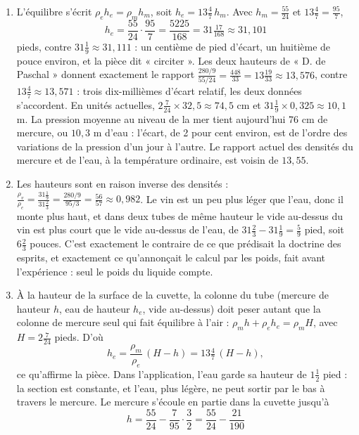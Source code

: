 \documentclass[11pt,a4paper]{article}
\begin{document}
\begin{solution}
\begin{enumerate}
\item L'équilibre s'écrit $\rho_e h_e = \rho_m h_m$, soit $h_e = 13\frac47\,h_m$.
  Avec $h_m = \frac{55}{24}$ et $13\frac47 = \frac{95}{7}$,
  \[
  h_e = \frac{55}{24}\cdot\frac{95}{7} = \frac{5225}{168} = 31\tfrac{17}{168}
  \approx 31{,}101
  \]
  pieds, contre $31\frac19 \approx 31{,}111$ : un centième de pied d'écart, un huitième de
  pouce environ, et la pièce dit « circiter ». Les deux hauteurs de
  « D. de Paschal » donnent exactement le rapport
  $\frac{280/9}{55/24} = \frac{448}{33} = 13\frac{19}{33} \approx 13{,}576$, contre
  $13\frac47 \approx 13{,}571$ : trois dix-millièmes d'écart relatif, les deux
  données s'accordent. En unités actuelles, $2\frac{7}{24}\times 32{,}5 \approx
  74{,}5$ cm et $31\frac19\times 0{,}325 \approx 10{,}1$ m. La pression moyenne au
  niveau de la mer tient aujourd'hui 76 cm de mercure, ou $10{,}3$ m d'eau :
  l'écart, de 2 pour cent environ, est de l'ordre des variations de la pression d'un
  jour à l'autre. Le rapport actuel des densités du mercure et de l'eau, à la
  température ordinaire, est voisin de $13{,}55$.
\item Les hauteurs sont en raison inverse des densités :
  $\frac{\rho_v}{\rho_e} = \frac{31\frac19}{31\frac23} = \frac{280/9}{95/3} =
  \frac{56}{57} \approx 0{,}982$. Le vin est un peu plus léger que l'eau, donc il
  monte plus haut, et dans deux tubes de même hauteur le vide au-dessus du vin est
  plus court que le vide au-dessus de l'eau, de $31\frac23 - 31\frac19 = \frac59$
  pied, soit $6\frac23$ pouces. C'est exactement le contraire de ce que prédisait
  la doctrine des esprits, et exactement ce qu'annonçait le calcul par les poids,
  fait avant l'expérience : seul le poids du liquide compte.
\item À la hauteur de la surface de la cuvette, la colonne du tube (mercure de
  hauteur $h$, eau de hauteur $h_e$, vide au-dessus) doit peser autant que la
  colonne de mercure seul qui fait équilibre à l'air :
  $\rho_m h + \rho_e h_e = \rho_m H$, avec $H = 2\frac{7}{24}$ pieds. D'où
  \[
  h_e = \frac{\rho_m}{\rho_e}\,(H - h) = 13\tfrac47\,(H - h),
  \]
  ce qu'affirme la pièce. Dans l'application, l'eau garde sa hauteur de $1\frac12$
  pied : la section est constante, et l'eau, plus légère, ne peut sortir par le bas
  à travers le mercure. Le mercure s'écoule en partie dans la cuvette jusqu'à
  \[
  h = \frac{55}{24} - \frac{7}{95}\cdot\frac32 = \frac{55}{24} - \frac{21}{190}
\]
\end{enumerate}
\end{solution}
\end{document}
